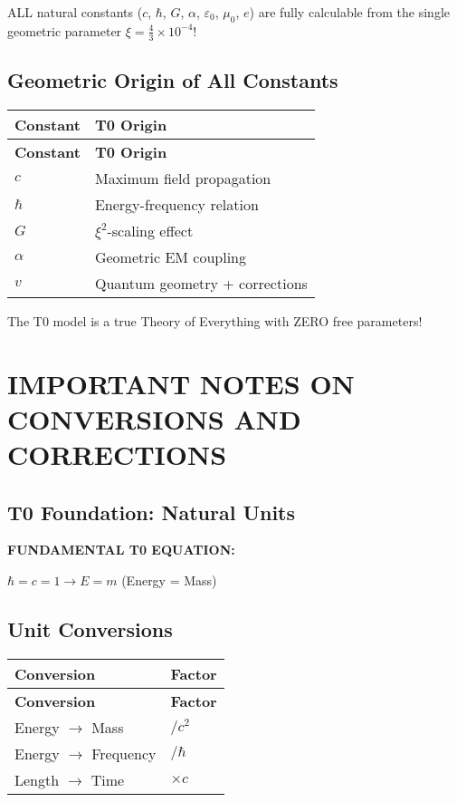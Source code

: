 \documentclass[12pt,a4paper]{article}
\begin{document}
	ALL natural constants (\(c\), \(\hbar\), \(G\), \(\alpha\), \(\varepsilon_0\), \(\mu_0\), \(e\)) are fully calculable from the single geometric parameter \(\xi = \frac{4}{3} \times 10^{-4}\)!
	
	\subsection{Geometric Origin of All Constants}
	
	\begin{longtable}{|p{3cm}|p{5cm}|}
		\hline
		\textbf{Constant} & \textbf{T0 Origin} \\
		\hline
		\endfirsthead
		\hline
		\textbf{Constant} & \textbf{T0 Origin} \\
		\hline
		\endhead
		\(c\) & Maximum field propagation \\
		\hline
		\(\hbar\) & Energy-frequency relation \\
		\hline
		\(G\) & \(\xi^{2}\)-scaling effect \\
		\hline
		\(\alpha\) & Geometric EM coupling \\
		\hline
		\(v\) & Quantum geometry + corrections \\
		\hline
	\end{longtable}
	
	The T0 model is a true Theory of Everything with ZERO free parameters!
	
	\section{IMPORTANT NOTES ON CONVERSIONS AND CORRECTIONS}
	
	\subsection{T0 Foundation: Natural Units}
	
	\textbf{FUNDAMENTAL T0 EQUATION:}
	\begin{center}
		\(\hbar = c = 1 \rightarrow E = m\) (Energy = Mass)
	\end{center}
	
	\subsection{Unit Conversions}
	
	\begin{longtable}{|p{3cm}|p{3cm}|}
		\hline
		\textbf{Conversion} & \textbf{Factor} \\
		\hline
		\endfirsthead
		\hline
		\textbf{Conversion} & \textbf{Factor} \\
		\hline
		\endhead
		Energy \(\rightarrow\) Mass & \(/c^{2}\) \\
		\hline
		Energy \(\rightarrow\) Frequency & \(/\hbar\) \\
		\hline
		Length \(\rightarrow\) Time & \(\times c\) \\
		\hline
	\end{longtable}
	
\end{document}
